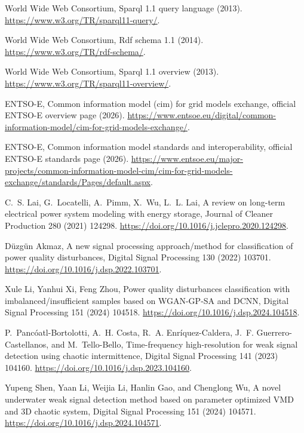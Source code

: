 {World Wide Web Consortium},
  Sparql 1.1 query language
  (2013).
\url{https://www.w3.org/TR/sparql11-query/}.

{World Wide Web Consortium}, Rdf
  schema 1.1 (2014).
\url{https://www.w3.org/TR/rdf-schema/}.

{World Wide Web Consortium},
  Sparql 1.1 overview (2013).
\url{https://www.w3.org/TR/sparql11-overview/}.

{ENTSO-E},
  Common
  information model (cim) for grid models exchange, official ENTSO-E overview
  page (2026).
\url{https://www.entsoe.eu/digital/common-information-model/cim-for-grid-models-exchange/}.

{ENTSO-E},
  Common
  information model standards and interoperability, official ENTSO-E standards
  page (2026).
\url{https://www.entsoe.eu/major-projects/common-information-model-cim/cim-for-grid-models-exchange/standards/Pages/default.aspx}.

C.~S. Lai, G.~Locatelli, A.~Pimm, X.~Wu, L.~L. Lai,
  A review on long-term
  electrical power system modeling with energy storage, Journal of Cleaner
  Production 280 (2021) 124298.
\url{https://doi.org/10.1016/j.jclepro.2020.124298}.

Düzgün Akmaz, A new signal processing approach/method for classification of
  power quality disturbances, Digital Signal Processing 130 (2022) 103701.
\url{https://doi.org/10.1016/j.dsp.2022.103701}.

Xule Li, Yanhui Xi, Feng Zhou, Power quality disturbances classification with
  imbalanced/insufficient samples based on WGAN-GP-SA and DCNN, Digital Signal
  Processing 151 (2024) 104518.
\url{https://doi.org/10.1016/j.dsp.2024.104518}.

P.~Pancóatl-Bortolotti, A.~H. Costa, R.~A. Enríquez-Caldera, J.~F.
  Guerrero-Castellanos, and M.~Tello-Bello, Time-frequency high-resolution for
  weak signal detection using chaotic intermittence, Digital Signal Processing
  141 (2023) 104160.
\url{https://doi.org/10.1016/j.dsp.2023.104160}.

Yupeng Shen, Yaan Li, Weijia Li, Hanlin Gao, and Chenglong Wu, A novel
  underwater weak signal detection method based on parameter optimized VMD and
  3D chaotic system, Digital Signal Processing 151 (2024) 104571.
\url{https://doi.org/10.1016/j.dsp.2024.104571}.

